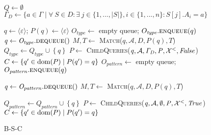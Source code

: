 \begin{figure}[t]
	\removelatexerror
	\begin{algorithm}[H]
	\footnotesize
    \caption{B-S-C}
    \label{alg-bu-bf}

	\BlankLine
	$\mathit{Q \leftarrow \emptyset}$\;
	$\Gamma_D \gets \{a \in \Gamma \mid \forall \ S \in D: \exists \
	j\in\{1,...,|S|\}, i\in\{1,...,n\}: S[j].A_i = a\}$\;

	$q \gets\langle\varepsilon\rangle$; $P(q) \gets
	\langle\varepsilon\rangle$\;
    $O_{\mathit{type}} \leftarrow$ empty queue;
    $O_{\mathit{type}}.\textsc{enqueue}(q)$\;
    {
    	\label{alg6:while_type_start}
    	$\mathit{q \leftarrow O_{type}}.\textsc{dequeue}()$\;
        $\mathit{M,T \leftarrow}$ \textsc{Match}($\mathit{q,\mathcal{A},D,
        P(q),T}$)\;
        {   $\mathit{Q_{type} \leftarrow Q_{type} \cup \left\{q\right\} }$\;
            $\mathit{P \leftarrow}$
            \textsc{ChildQueries}($\mathit{q,\mathcal{A},\Gamma_D,
            P,\mathcal{X}^<,
            \mathit{False}}$)\;
			${C} \leftarrow  \{q'\in \operatorname{dom}(P) \mid P(q')=q\}$\;
        }
    	\label{alg6:while_type_end}
    }
	$O_{\mathit{pattern}} \leftarrow$ empty queue;
	$O_{\mathit{pattern}}.\textsc{enqueue}(q)$\;
    {

    	\label{alg6:while_pattern_start}
    	$\mathit{q \leftarrow O_{pattern}}.\textsc{dequeue}()$\;
        $\mathit{M,T \leftarrow}$
        \textsc{Match}($\mathit{q,\mathcal{A},D,P(q),T}$)\;
        {   $\mathit{Q_{pattern} \leftarrow Q_{pattern} \cup \left\{q\right\} }$\;
            $\mathit{P \leftarrow}$
            \textsc{ChildQueries}($\mathit{q,\mathcal{A},\emptyset,P,
            \mathcal{X}^<,\mathit{True}}$)\;
			${C} \leftarrow  \{q'\in \operatorname{dom}(P) \mid P(q')=q\}$\;

}}
\end{algorithm}
\end{figure}

